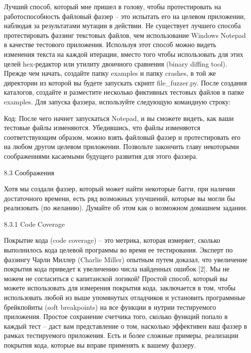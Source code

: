 \documentclass[12pt]{book}
\begin{document}
Лучший способ, который мне пришел в голову, чтобы протестировать на работоспособность файловый фаззер – это испытать его на целевом приложении, наблюдая за результатами мутации в действии. Не существует лучшего способа протестировать фаззинг текстовых файлов, чем использование Windows Notepad в качестве тестового приложения. Используя этот способ можно видеть изменения текста на каждой итерации, вместо того чтобы использовать для этих целей hex-редактор или утилиту двоичного сравнения (binary diffing tool). Прежде чем начать, создайте папку examples и папку crashes, в той же директории из которой вы будете запускать скрипт file\_fuzzer.py. После создания каталогов, создайте и разместите несколько фиктивных тестовых файлов в папке examples. Для запуска фаззера, используйте следующую командную строку:

Код:
После чего начнет запускаться Notepad, и вы сможете видеть, как ваши тестовые файлы изменяются. Убедившись, что файлы изменяются соответствующим образом, можно взять файловый фаззер и протестировать его на любом другом целевом приложении. Позвольте закончить главу некоторыми соображениями касаемыми будущего развития для этого фаззера.


8.3 Соображения

Хотя мы создали фаззер, который может найти некоторые багги, при наличии достаточного времени, есть ряд возможных улучшений, которые вы могли бы реализовать (по желанию). Думайте об этом как о возможном домашнем задании.

8.3.1 Code Coverage

Покрытие кода (code coverage) – это метрика, которая измеряет, сколько выполнилось кода целевой программы во время ее тестирования. Эксперт по фаззингу Чарли Миллер (Charlie Miller) опытным путем доказал, что увеличение покрытия кода приведет к увеличению числа найденных ошибок [2]. Мы не можем не согласиться с капитанской логикой! Простой способ, который вы можете использовать для измерения покрытия кода, заключается в том, чтобы использовать любой из выше упомянутых отладчиков и установить программные брейкпойнты (soft breakpoints) на все функции в нутрии тестируемого приложения. Простое сохранение счетчика того, сколько функций попало в каждый тест – даст вам представление о том, насколько эффективен ваш фаззер в рамках тестируемого приложения. Есть и более сложные примеры, реализации покрытия кода, которые вы вправе применять к вашему фаззеру.
\end{document}
